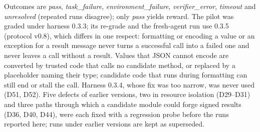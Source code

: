 Outcomes are \emph{pass}, \emph{task\_failure}, \emph{environment\_failure}, \emph{verifier\_error}, \emph{timeout} and \emph{unresolved} (repeated runs disagree); only \emph{pass} yields reward. The pilot was graded under harness 0.3.3; its re-grade and the fresh-agent run use 0.3.5 (protocol v0.8), which differs in one respect: formatting or encoding a value or an exception for a result message never turns a successful call into a failed one and never leaves a call without a result. Values that JSON cannot encode are converted by trusted code that calls no candidate method, or replaced by a placeholder naming their type; candidate code that runs during formatting can still end or stall the call. Harness 0.3.4, whose fix was too narrow, was never used (D51, D52). Five defects of earlier versions, two in resource isolation (D29--D31) and three paths through which a candidate module could forge signed results (D36, D40, D44), were each fixed with a regression probe before the runs reported here; runs under earlier versions are kept as superseded.
